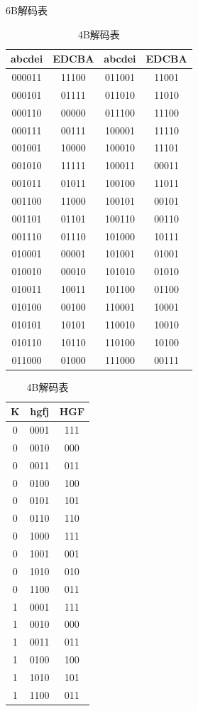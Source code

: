\documentclass[UTF8]{ctexart}
\begin{document}
\begin{table}[H]
\begin{minipage}[t]{.5\textwidth}
\centering
\caption{6B解码表}
\label{tab:tab_6B_tab}
\begin{tabular}{|c|c|c|c|}
\hline
	abcdei	&	EDCBA	&	abcdei	&	EDCBA	\\
\hline
	000011	&	11100	&	011001	&	11001	\\
	000101	&	01111	&	011010	&	11010	\\
	000110	&	00000	&	011100	&	11100	\\
	000111	&	00111	&	100001	&	11110 	\\
	001001	&	10000	&	100010	&	11101 	\\
	001010	&	11111	&	100011	&	00011 	\\
	001011	&	01011	&	100100	&	11011 	\\
	001100	&	11000	&	100101	&	00101 	\\
	001101	&	01101	&	100110	&	00110 	\\
	001110	&	01110	&	101000	&	10111 	\\
	010001	&	00001	&	101001	&	01001 	\\
	010010	&	00010	&	101010	&	01010 	\\
	010011	&	10011	&	101100	&	01100 	\\
	010100	&	00100	&	110001	&	10001 	\\
	010101	&	10101	&	110010	&	10010 	\\
	010110	&	10110	&	110100	&	10100 	\\
	011000	&	01000	&	111000	&	00111 	\\
\hline
\end{tabular}
\end{minipage}
\begin{minipage}[t]{.5\textwidth}
\centering
\caption{4B解码表}
\label{tab:tab_4B_tab}
\begin{tabular}{|c|c|c|}
\hline
	K	&	hgfj	&	HGF	\\
\hline
	0	&	0001	&	111	\\
	0	&	0010	&	000	\\
	0	&	0011	&	011	\\
	0	&	0100	&	100	\\
	0	&	0101	&	101	\\
	0	&	0110	&	110	\\
	0	&	1000	&	111	\\
	0	&	1001	&	001	\\
	0	&	1010	&	010	\\
	0	&	1100	&	011	\\
	1	&	0001	&	111	\\
	1	&	0010	&	000	\\
	1	&	0011	&	011	\\
	1	&	0100	&	100	\\
	1	&	1010	&	101	\\
	1	&	1100	&	011	\\
\hline
\end{tabular}
\end{minipage}
\end{table}
\end{document}
